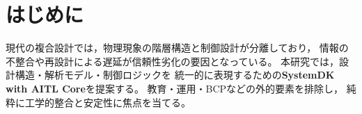\section{はじめに}
現代の複合設計では，物理現象の階層構造と制御設計が分離しており，
情報の不整合や再設計による遅延が信頼性劣化の要因となっている。
本研究では，設計構造・解析モデル・制御ロジックを
統一的に表現するための\textbf{SystemDK with AITL Core}を提案する。
教育・運用・BCPなどの外的要素を排除し，
純粋に工学的整合と安定性に焦点を当てる。
